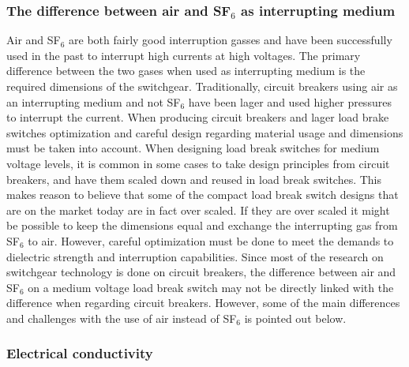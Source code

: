 \documentclass[10pt,a4paper]{article} %
\begin{document}
\subsubsection{The difference between air and SF$_6$ as interrupting medium} \label{sec:airandsf}

Air and SF$_6$ are both fairly good interruption gasses and have been successfully used in the past to interrupt high currents at high voltages. The primary difference between the two gases when used as interrupting medium is the required dimensions of the switchgear. Traditionally, circuit breakers using air as an interrupting medium and not SF$_6$ have been lager and used higher pressures to interrupt the current. When producing circuit breakers and lager load brake switches optimization and careful design regarding material usage and dimensions must be taken into account. When designing load break switches for medium voltage levels, it is common in some cases to take design principles from circuit breakers, and have them scaled down and reused in load break switches. This makes reason to believe that some of the compact load break switch designs that are on the market today are in fact over scaled. If they are over scaled it might be possible to keep the dimensions equal and exchange the interrupting gas from SF$_6$ to air. However, careful optimization must be done to meet the demands to dielectric strength and interruption capabilities. Since most of the research on switchgear technology is done on circuit breakers, the difference between air and SF$_6$ on a medium voltage load break switch may not be directly linked with the difference when regarding circuit breakers. However, some of the main differences and challenges with the use of air instead of SF$_6$ is pointed out below.

\subsubsection*{Electrical conductivity}
\end{document}
